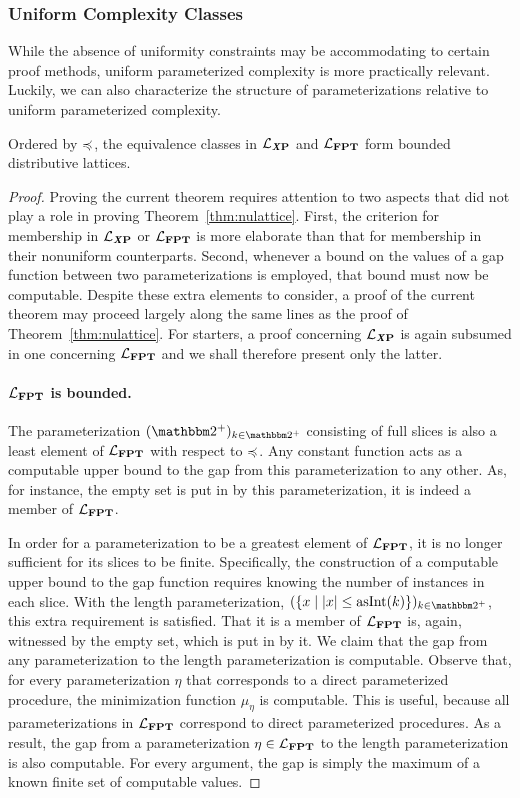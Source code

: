 \subsubsection{Uniform Complexity Classes}
While the absence of uniformity constraints may be accommodating to certain proof methods, uniform parameterized complexity is more practically relevant.
Luckily, we can also characterize the structure of parameterizations relative to uniform parameterized complexity.
\begin{theorem}
\label{thm:lattice}
  Ordered by $\preccurlyeq$, the equivalence classes in $\mathcal{L}_{\textnormal{\textbf{\textit{X}P}}}$ and $\mathcal{L}_{\textnormal{\textbf{FPT}}}$ form bounded distributive lattices.
\end{theorem}
\begin{proof}
  Proving the current theorem requires attention to two aspects that did not play a role in proving  Theorem~\ref{thm:nulattice}.
  First, the criterion for membership in $\mathcal{L}_{\textnormal{\textbf{\textit{X}P}}}$ or $\mathcal{L}_{\textnormal{\textbf{FPT}}}$ is more elaborate than that for membership in their nonuniform counterparts.
  Second, whenever a bound on the values of a gap function between two parameterizations is employed, that bound must now be computable.
  Despite these extra elements to consider, a proof of the current theorem may proceed largely along the same lines as the proof of Theorem~\ref{thm:nulattice}.
  For starters, a proof concerning $\mathcal{L}_{\textnormal{\textbf{\textit{X}P}}}$ is again subsumed in one concerning $\mathcal{L}_{\textnormal{\textbf{FPT}}}$ and we shall therefore present only the latter.

  \paragraph{$\mathcal{L}_{\textnormal{\textbf{FPT}}}$ is bounded.}
  The parameterization $(\binary^+)_{k \in \binary^+}$ consisting of full slices is also a least element of $\mathcal{L}_{\textnormal{\textbf{FPT}}}$ with respect to $\preccurlyeq$.
  Any constant function acts as a computable upper bound to the gap from this parameterization to any other.
  As, for instance, the empty set is put in  by this parameterization, it is indeed a member of $\mathcal{L}_{\textnormal{\textbf{FPT}}}$.

  In order for a parameterization to be a greatest element of $\mathcal{L}_{\textnormal{\textbf{FPT}}}$, it is no longer sufficient for its slices to be finite.
  Specifically, the construction of a computable upper bound to the gap function requires knowing the number of instances in each slice.
  With the length parameterization, $(\{x \st \length{x} \le \asNat(k)\})_{k \in \binary^+}$, this extra requirement is satisfied.
  That it is a member of $\mathcal{L}_{\textnormal{\textbf{FPT}}}$ is, again, witnessed by the empty set, which is put in  by it.
  We claim that the gap from any parameterization to the length parameterization is computable.
  Observe that, for every parameterization $\eta$ that corresponds to a direct parameterized procedure, the minimization function $\mu_\eta$ is computable.
  This is useful, because all parameterizations in $\mathcal{L}_{\textnormal{\textbf{FPT}}}$ correspond to direct parameterized procedures.
  As a result, the gap from a parameterization $\eta \in \mathcal{L}_{\textnormal{\textbf{FPT}}}$ to the length parameterization is also computable.
  For every argument, the gap is simply the maximum of a known finite set of computable values.


\end{proof}
